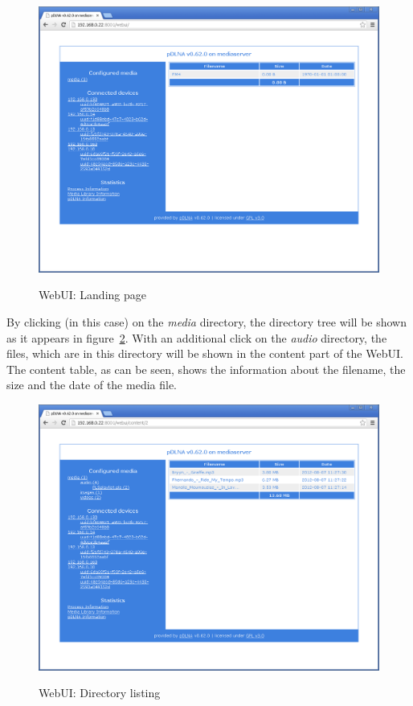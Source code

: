 \documentclass[a4paper,oneside,10pt]{report}
\begin{document}
\begin{figure}
	\centering
		\includegraphics[width=34em]{images/webui_content_landing}
	\label{fig:webgui-landingpage}
	\caption{WebUI: Landing page}
\end{figure}

By clicking (in this case) on the {\em media} directory, the directory tree will be shown as it appears in figure~\ref{fig:webgui-audio}. With an additional click on the {\em audio} directory, the files, which are in this directory will be shown in the content part of the WebUI. The content table, as can be seen, shows the information about the filename, the size and the date of the media file.

\begin{figure}
	\centering
		\includegraphics[width=34em]{images/webui_content_audio}
	\label{fig:webgui-audio}
	\caption{WebUI: Directory listing}
\end{figure}
\end{document}
